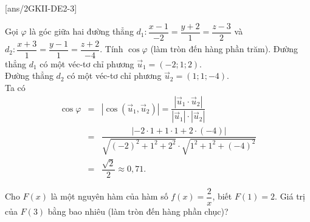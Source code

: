 [ans/2GKII-DE2-3]
\caukq


\begin{ex}%
	Gọi $\varphi$ là góc giữa hai đường thẳng $d_1 \colon \dfrac{x-1}{-2}= \dfrac{y+2}{1}= \dfrac{z-3}{2}$ và $d_2 \colon \dfrac{x+3}{1}= \dfrac{y-1}{1}= \dfrac{z+2}{-4}$. Tính $\cos \varphi$ (làm tròn đến hàng phần trăm).
	\loigiai
	{
		Đường thẳng $ d_1 $ có một véc-tơ chỉ phương $ \vec u_1 =(-2;1;2)$.\\
		Đường thẳng $ d_2 $ có một véc-tơ chỉ phương $ \vec u_2 =(1;1;-4)$.\\
		Ta có
			\begin{eqnarray*}
			\cos \varphi
			&=&\left| \cos \left( \vec u_1, \vec u_2 \right)\right| = \dfrac{\left|  \vec u_1 \cdot  \vec u_2 \right|}{\left| { \vec u_1} \right| \cdot \left| { \vec u_2} \right|}\\
			&=&\dfrac{|-2 \cdot 1+ 1\cdot 1+ 2\cdot (-4)|}{\sqrt{(-2)^2+1^2+2^2} \cdot \sqrt{1^2+1^2+(-4)^2}}\\
			&=& \dfrac{\sqrt {2}}{2} \approx 0{,}71.
		\end{eqnarray*}
		}
\end{ex}

\begin{ex}%
	Cho $F(x)$ là một nguyên hàm của hàm số $f(x)= \dfrac{2}{x}$, biết $F(1)=2$. Giá trị của $F(3)$ bằng bao nhiêu (làm tròn đến hàng phần chục)?
\end{ex}

